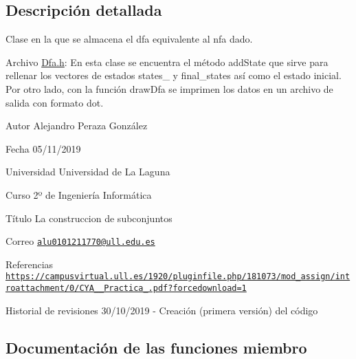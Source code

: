 \subsection{Descripción detallada}
Clase en la que se almacena el dfa equivalente al nfa dado. 

Archivo \hyperlink{Dfa_8h_source}{Dfa.\+h}\+: En esta clase se encuentra el método add\+State que sirve para rellenar los vectores de estados states\+\_\+ y final\+\_\+states así como el estado inicial. Por otro lado, con la función draw\+Dfa se imprimen los datos en un archivo de salida con formato dot.

\begin{DoxyAuthor}{Autor}
Alejandro Peraza González 
\end{DoxyAuthor}
\begin{DoxyDate}{Fecha}
05/11/2019 
\end{DoxyDate}
\begin{DoxyParagraph}{Universidad}
Universidad de La Laguna 
\end{DoxyParagraph}
\begin{DoxyParagraph}{Curso}
2º de Ingeniería Informática 
\end{DoxyParagraph}
\begin{DoxyParagraph}{Título}
La construccion de subconjuntos 
\end{DoxyParagraph}
\begin{DoxyParagraph}{Correo }
\href{mailto:alu0101211770@ull.edu.es}{\tt alu0101211770@ull.\+edu.\+es} 
\end{DoxyParagraph}
\begin{DoxyParagraph}{Referencias}
\href{https://campusvirtual.ull.es/1920/pluginfile.php/181073/mod_assign/introattachment/0/CYA_1920_Practica_7.pdf?forcedownload=1}{\tt https\+://campusvirtual.\+ull.\+es/1920/pluginfile.\+php/181073/mod\+\_\+assign/introattachment/0/\+C\+Y\+A\+\_\+\_\+\+Practica\+\_.\+pdf?forcedownload=1} 
\end{DoxyParagraph}
\begin{DoxyParagraph}{Historial de revisiones}
30/10/2019 -\/ Creación (primera versión) del código 
\end{DoxyParagraph}


\subsection{Documentación de las funciones miembro}
\mbox{\label{classDfa_a31436e55ea182f71b9f2b903b18d4ba5}} 
